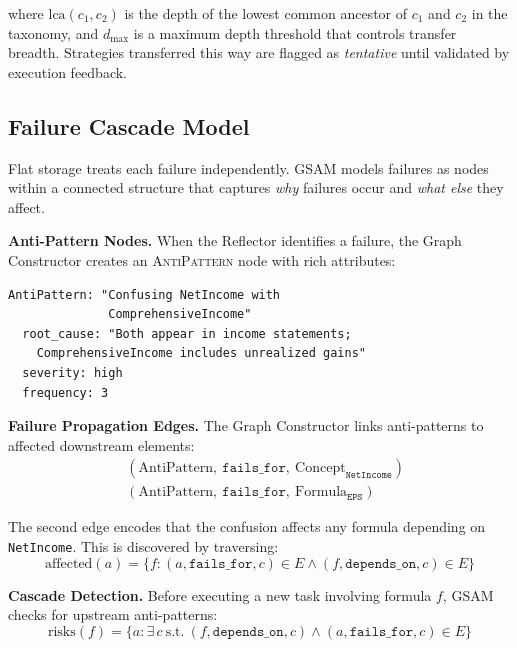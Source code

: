 \documentclass[12pt,a4paper]{article}
\begin{document}
where $\text{lca}(c_1, c_2)$ is the depth of the lowest common ancestor of $c_1$ and $c_2$ in the taxonomy, and $d_{\max}$ is a maximum depth threshold that controls transfer breadth. Strategies transferred this way are flagged as \textit{tentative} until validated by execution feedback.


\subsection{Failure Cascade Model}
\label{sec:failure}

Flat storage treats each failure independently. GSAM models failures as nodes within a connected structure that captures \textit{why} failures occur and \textit{what else} they affect.

\textbf{Anti-Pattern Nodes.} When the Reflector identifies a failure, the Graph Constructor creates an \textsc{AntiPattern} node with rich attributes:

\begin{verbatim}
AntiPattern: "Confusing NetIncome with
              ComprehensiveIncome"
  root_cause: "Both appear in income statements;
    ComprehensiveIncome includes unrealized gains"
  severity: high
  frequency: 3
\end{verbatim}

\textbf{Failure Propagation Edges.} The Graph Constructor links anti-patterns to affected downstream elements:
\begin{align}
&(\text{AntiPattern},\ \texttt{fails\_for},\ \text{Concept}_{\texttt{NetIncome}}) \\
&(\text{AntiPattern},\ \texttt{fails\_for},\ \text{Formula}_{\texttt{EPS}})
\end{align}

The second edge encodes that the confusion affects any formula depending on \texttt{NetIncome}. This is discovered by traversing:
\begin{equation}
\text{affected}(a) = \{f : (a, \texttt{fails\_for}, c) \in E \land (f, \texttt{depends\_on}, c) \in E\}
\end{equation}

\textbf{Cascade Detection.} Before executing a new task involving formula $f$, GSAM checks for upstream anti-patterns:
\begin{equation}
\text{risks}(f) = \{a : \exists\, c\ \text{s.t.}\ (f, \texttt{depends\_on}, c) \land (a, \texttt{fails\_for}, c) \in E\}
\end{equation}
\end{document}
